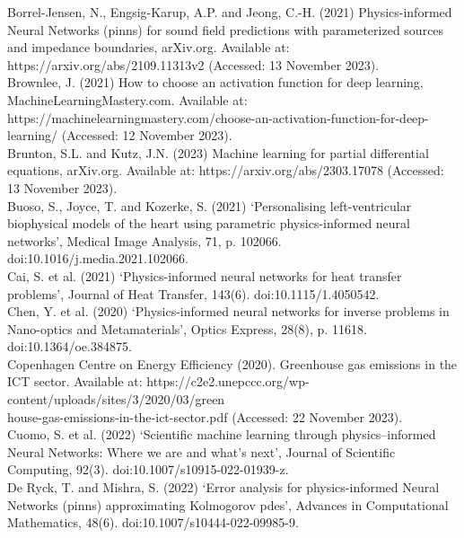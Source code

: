 \documentclass[12pt, openany]{book}
\begin{document}
Borrel-Jensen, N., Engsig-Karup, A.P. and Jeong, C.-H. (2021) Physics-informed Neural Networks (pinns) for sound field predictions with parameterized sources and impedance boundaries, arXiv.org. Available at: https://arxiv.org/abs/2109.11313v2 (Accessed: 13 November 2023). \\

Brownlee, J. (2021) How to choose an activation function for deep learning, MachineLearningMastery.com. Available at: https://machinelearningmastery.com/choose-an-activation-function-for-deep-learning/ (Accessed: 12 November 2023). \\

Brunton, S.L. and Kutz, J.N. (2023) Machine learning for partial differential equations, arXiv.org. Available at: https://arxiv.org/abs/2303.17078 (Accessed: 13 November 2023). \\

Buoso, S., Joyce, T. and Kozerke, S. (2021) ‘Personalising left-ventricular biophysical models of the heart using parametric physics-informed neural networks’, Medical Image Analysis, 71, p. 102066. doi:10.1016/j.media.2021.102066. \\

Cai, S. et al. (2021) ‘Physics-informed neural networks for heat transfer problems’, Journal of Heat Transfer, 143(6). doi:10.1115/1.4050542. \\

Chen, Y. et al. (2020) ‘Physics-informed neural networks for inverse problems in Nano-optics and Metamaterials’, Optics Express, 28(8), p. 11618. doi:10.1364/oe.384875. \\

Copenhagen Centre on Energy Efficiency (2020). Greenhouse gas emissions in the ICT sector. Available at: https://c2e2.unepccc.org/wp-content/uploads/sites/3/2020/03/green \\ house-gas-emissions-in-the-ict-sector.pdf (Accessed: 22 November 2023). \\

Cuomo, S. et al. (2022) ‘Scientific machine learning through physics–informed Neural Networks: Where we are and what’s next’, Journal of Scientific Computing, 92(3). doi:10.1007/s10915-022-01939-z. \\

De Ryck, T. and Mishra, S. (2022) ‘Error analysis for physics-informed Neural Networks (pinns) approximating Kolmogorov pdes’, Advances in Computational Mathematics, 48(6). doi:10.1007/s10444-022-09985-9. \\
\end{document}
